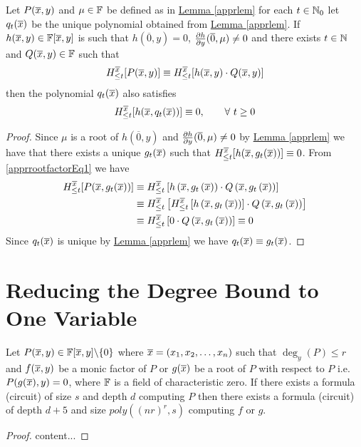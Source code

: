 \begin{corollary}\label{apprrootfactor}
	Let $P(\overline{x},y)$ and $\mu\in \mathbb{F}$ be defined as in \hyperref[apprlem]{Lemma \ref{apprlem}} for each $t\in \mathbb{N}_0$ let $q_t(\overline{x})$ be the unique polynomial obtained from \hyperref[apprlem]{Lemma \ref{apprlem}}. If $h(\overline{x},y)\in \mathbb{F}[\overline{x},y]$ is such that $h(\overline{0},y)=0$, $\frac{\partial h}{\partial y}(\overline{0},\mu)\neq 0$ and there exists $t\in \mathbb{N}$ and $Q(\overline{x},y)\in \mathbb{F}$ such that 
	\begin{equation}
		H_{\leq t}^{\overline{x}}[P(\overline{x},y)]\equiv H_{\leq t}^{\overline{x}}[h(\overline{x},y)\cdot Q(\overline{x},y)]\label{apprrootfactorEq1}
	\end{equation}
	then the polynomial $q_t(\overline{x})$ also satisfies 
	\begin{equation}
		H_{\leq t}^{\overline{x}}[h(\overline{x},q_t(\overline{x}))]\equiv 0, \qquad \forall\ t\geq 0\label{apprrootfactorEq2}
	\end{equation}
\end{corollary}

\begin{proof}
	Since $\mu$ is a root of $h(\overline{0},y)$ and $\frac{\partial h}{\partial y}(\overline{0},\mu)\neq 0$ by \hyperref[apprlem]{Lemma \ref{apprlem}} we have that there exists a unique $g_t(\overline{x})$ such that $H_{\leq t}^{\overline{x}}[h(\overline{x},g_t(\overline{x}))]\equiv 0$. From \eqref{apprrootfactorEq1} we have 
	\begin{align*}
		H_{\leq t}^{\overline{x}}[P(\overline{x},g_t(\overline{x}))] & \equiv H_{\leq t}^{\overline{x}}\left[h\left(\overline{x},g_t\left(\overline{x}\right)\right)\cdot Q\left(\overline{x},g_t\left(\overline{x}\right)\right)\right]                          \\
		& \equiv H_{\leq t}^{\overline{x}}\left[H_{\leq t}^{\overline{x}}\left[h\left(\overline{x},g_t\left(\overline{x}\right)\right)\right]\cdot Q\left(\overline{x},g_t\left(\overline{x}\right)\right)\right] \\
		& \equiv H_{\leq t}^{\overline{x}}\left[0\cdot Q\left(\overline{x},g_t\left(\overline{x}\right)\right)\right]\equiv 0
	\end{align*}
	Since $q_t(\overline{x})$ is unique by \hyperref[apprlem]{Lemma \ref{apprlem}} we have $q_t(\overline{x})\equiv g_t(\overline{x})$.
\end{proof}

\section{Reducing the Degree Bound to One Variable}
\begin{theorem}
	Let $P(\overline{x},y)\in\mathbb{F}[\overline{x},y]\backslash \{0\}$ where $\overline{x}=(x_1,x_2,\dots,x_n)$ such that $\deg_y(P)\leq r$ and $f(\overline{x},y)$ be a monic factor of $P$ or $g(\overline{x})$ be a root of $P$ with respect to $P$ i.e. $P(g(\overline{x}),y)=0$, where $\mathbb{F}$ is a field of characteristic zero. If there exists a formula (circuit) of size $s$ and depth $d$ computing $P$ then there exists a formula (circuit) of depth $d+5$  and size $poly((nr)^r,s)$ computing $f$ or $g$.
\end{theorem}

\begin{proof}
	content...
\end{proof}